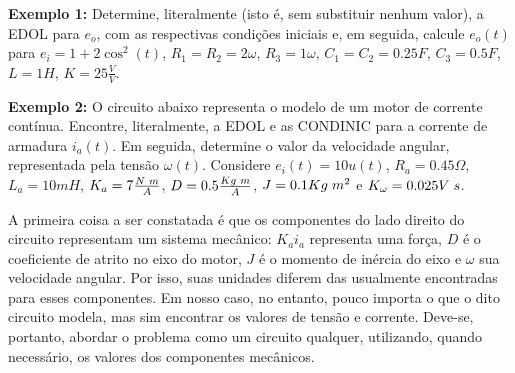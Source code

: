 \documentclass{article}
\numberwithin{equation}{section}
\let\dfr\dfrac
\begin{document}
\noindent\textbf{Exemplo 1: }Determine, literalmente (isto é, sem substituir nenhum valor), a EDOL para $e_o$, com as respectivas condições iniciais e, em seguida, calcule $e_o(t)$ para $e_i= 1 + 2\cos^2(t)$, $R_1 = R_2 = 2\omega$, $R_3=1\omega$, $C_1 = C_2 = 0.25F$, $C_3 = 0.5F$, $L=1H$, $K = 25 \frac{V}{V}$.

\begin{center}
\end{center}

\noindent\textbf{Exemplo 2:} O circuito abaixo representa o modelo de um motor de corrente contínua. Encontre, literalmente, a EDOL e as CONDINIC para a corrente de armadura $i_a(t)$. Em seguida, determine o valor da velocidade angular, representada pela tensão $\omega(t)$. Considere $e_i(t)=10u(t)$, $R_a=0.45\Omega$, $L_a=10mH$, $K_a=7\frac{N \hspace{1mm} m}{A}$, $D=0.5\frac{Kg \hspace{1mm} m}{A}$, $J=0.1Kg \hspace{1mm} m^2$ e $K_{\omega} = 0.025V \hspace{1mm} s$.

\begin{center}
\end{center}

\noindent A primeira coisa a ser constatada é que os componentes do lado direito do circuito representam um sistema mecânico: $K_a i_a$ representa uma força, $D$ é o coeficiente de atrito no eixo do motor, $J$ é o momento de inércia do eixo e $\omega$ sua velocidade angular. Por isso, suas unidades diferem das usualmente encontradas para esses componentes. Em nosso caso, no entanto, pouco importa o que o dito circuito modela, mas sim encontrar os valores de tensão e corrente. Deve-se, portanto, abordar o problema como um circuito qualquer, utilizando, quando necessário, os valores dos componentes mecânicos.
\end{document}
